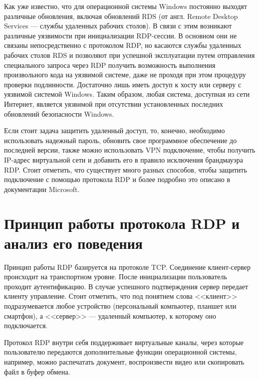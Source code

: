 \documentclass[bachelor, och, coursework]{SCWorks}
\begin{document}
Как уже известно, что для операционной системы Windows постоянно выходят различные обновления, включая обновлений RDS (от англ. Remote Desktop Services --- службы 
удаленных рабочих столов). В связи с этим возникают различные уязвимости при инициализации RDP-сессии. В основном они не связаны непосредственно с
протоколом RDP, но касаются службы удаленных рабочих столов RDS и позволяют при успешной эксплуатации путем отправления специального запроса через RDP
получить возможность выполнения произвольного кода на уязвимой системе, даже не проходя при этом процедуру проверки подлинности. Достаточно лишь иметь доступ
к хосту или серверу с уязвимой системой Windows. Таким образом, любая система, доступная из сети Интернет, является уязвимой при отсутствии установленных
последних обновлений безопасности Windows.

Если стоит задача защитить удаленный доступ, то, конечно, необходимо использовать надежный пароль, обновить свое программное обеспечение до последней версии,
также можно использовать VPN подключение, чтобы получить IP-адрес виртуальной сети и добавить его в правило исключения брандмауэра RDP. Стоит отметить, что
существует много разных способов, чтобы защитить подключение с помощью протокола RDP и более подробно это описано в документации Microsoft.

  \section{Принцип работы протокола RDP и анализ его поведения}

  Принцип работы RDP базируется на протоколе TCP. Соединение клиент-сервер происходит на транспортном уровне. После инициализации пользователь 
  проходит аутентификацию. В случае успешного подтверждения сервер передает клиенту управление. Стоит отметить, что под понятием слова <<клиент>> подразумевается
  любое устройство (персональный компьютер, планшет или смартфон), а <<сервер>> --- удаленный компьютер, к которому оно подключается.

  Протокол RDP внутри себя поддерживает виртуальные каналы, через которые пользователю передаются дополнительные функции операционной системы,
  например, можно распечатать документ, воспроизвести видео или скопировать файл в буфер обмена.
\end{document}
